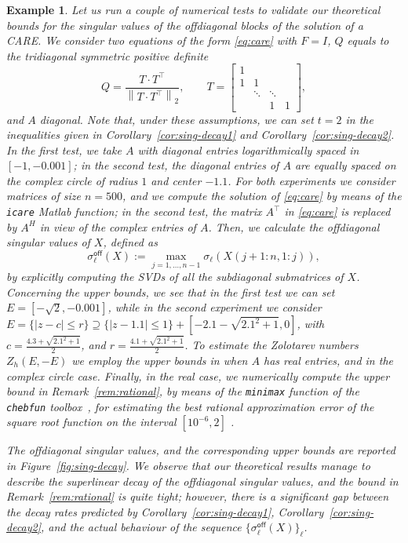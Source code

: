 \documentclass[a4paper,10pt]{article}
\newcommand{\norm}[1]{\left\lVert#1\right\rVert}
\newtheorem{example}{Example}
\begin{document}
\begin{example}\label{ex:decay}
Let us run a couple of numerical tests to validate our theoretical bounds for the singular values of the offdiagonal blocks of the solution of a CARE. We consider two equations of the form \eqref{eq:care} with $F=I$, $Q$ equals to the tridiagonal symmetric positive definite 
$$
Q= \frac{T\cdot T^\top}{\norm{T\cdot T^\top}_2},\qquad T=\begin{bmatrix}
	1\\
	1&1\\
	&\ddots&\ddots\\
	&&1&1	
\end{bmatrix},
$$ and $A$ diagonal. Note that, under these assumptions, we can set $t=2$ in the inequalities given in Corollary~\ref{cor:sing-decay1} and Corollary~\ref{cor:sing-decay2}. In the first test, we take $A$ with diagonal entries logarithmically spaced in $[-1, -0.001]$; in the second test, the diagonal entries of $A$ are equally spaced on the complex circle of radius $1$ and center $-1.1$. For both experiments we consider matrices of size $n=500$, and we compute the solution of \eqref{eq:care} by means of the \texttt{icare} Matlab function; in the second test, the matrix $A^\top$ in \eqref{eq:care} is replaced by $A^H$ in view of the complex entries of $A$. Then, we calculate the \emph{offdiagonal singular values of $X$}, defined as
$$
\sigma_\ell^{\mathsf{off}}(X):=\max_{j=1,\dots,n-1}\sigma_\ell(X(j+1:n, 1:j)),
$$
by explicitly computing the SVDs of all the subdiagonal submatrices of $X$. Concerning the upper bounds, we see that in the first test we can set $E=[-\sqrt{2}, -0.001]$, while in the second experiment we consider $E=\{|z-c|\le r\}\supseteq \{|z-1.1|\le 1\}+[-2.1-\sqrt{2.1^2+1}, 0]$, with $c=\frac{4.3+\sqrt{2.1^2+1}}2$, and $r= \frac{4.1+\sqrt{2.1^2+1}}{2}$.
To estimate the Zolotarev numbers $Z_h(E,-E)$ we employ the upper bounds in \cite[Theorem 2.1]{beckermann17} when $A$ has real entries, and \cite[Theorem 1]{townsend18} in the complex circle case. Finally, in the real case, we numerically compute the upper bound in Remark~\ref{rem:rational}, by means of the \texttt{minimax} function of the \texttt{chebfun} toolbox~\cite{chebfun}, for estimating the best rational approximation error of the square root function on the interval $[10^{-6}, 2]$ .

The offdiagonal singular values, and the corresponding upper bounds are reported in Figure~\ref{fig:sing-decay}. We observe that our theoretical results manage to describe the superlinear decay of the offdiagonal
singular values, and the bound in Remark~\ref{rem:rational} is quite tight; however, there is a significant gap between the  decay rates predicted by Corollary~\ref{cor:sing-decay1}, Corollary~\ref{cor:sing-decay2}, and 
the actual behaviour of the sequence $\{\sigma_\ell^{\mathsf{off}}(X)\}_\ell$.	
\end{example}
\end{document}
